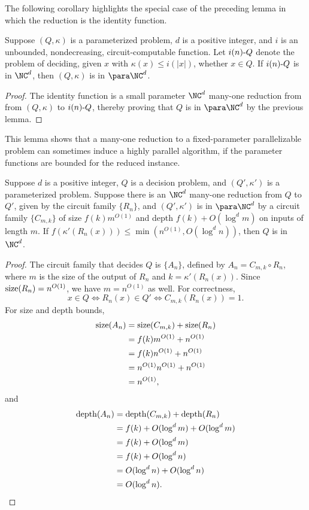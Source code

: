 The following corollary highlights the special case of the preceding lemma in which the reduction is the identity function.

\begin{corollary}\label{cor:sprself}
  Suppose $(Q, \kappa)$ is a parameterized problem, $d$ is a positive integer, and $i$ is an unbounded, nondecreasing, circuit-computable function.
  Let $i(n) \textnormal{-} Q$ denote the problem of deciding, given $x$ with $\kappa(x) \leq i(|x|)$, whether $x \in Q$.
  If $i(n) \textnormal{-} Q$ is in $\NC^d$, then $(Q, \kappa)$ is in $\para \NC^d$.
\end{corollary}
\begin{proof}
  The identity function is a small parameter $\NC^d$ many-one reduction from from $(Q, \kappa)$ to $i(n) \textnormal{-} Q$, thereby proving that $Q$ is in $\para \NC^d$ by the previous lemma.
\end{proof}

This lemma shows that a many-one reduction to a fixed-parameter parallelizable problem can sometimes induce a highly parallel algorithm, if the parameter functions are bounded for the reduced instance.

\begin{lemma}\label{lem:reducetonc}
  Suppose $d$ is a positive integer, $Q$ is a decision problem, and $(Q', \kappa')$ is a parameterized problem.
  Suppose there is an $\NC^d$ many-one reduction from $Q$ to $Q'$, given by the circuit family $\{R_n\}$, and $(Q', \kappa')$ is in $\para \NC^d$ by a circuit family $\{C_{m, k}\}$ of size $f(k) m^{O(1)}$ and depth $f(k) + O(\log^d m)$ on inputs of length $m$.
  If $f(\kappa'(R_n(x))) \leq \min(n^{O(1)}, O(\log^d n))$, then $Q$ is in $\NC^d$.
\end{lemma}
\begin{proof}
  The circuit family that decides $Q$ is $\{A_n\}$, defined by $A_n = C_{m, k} \circ R_n$, where $m$ is the size of the output of $R_n$ and $k = \kappa'(R_n(x))$.
  Since $\operatorname{size}(R_n) = n^{O(1)}$, we have $m = n^{O(1)}$ as well.
  For correctness,
  \[
  x \in Q \iff R_n(x) \in Q' \iff C_{m, k}(R_n(x)) = 1.
  \]
  For size and depth bounds,
  \begin{align*}
    \operatorname{size}(A_n) & = \operatorname{size}(C_{m, k}) + \operatorname{size}(R_n) \\
    & = f(k) m^{O(1)} + n^{O(1)} \\
    & = f(k) n^{O(1)} + n^{O(1)} \\
    & = n^{O(1)} n^{O(1)} + n^{O(1)} \\
    & = n^{O(1)},
  \end{align*}
  and
  \begin{align*}
    \operatorname{depth}(A_n) & = \operatorname{depth}(C_{m, k}) + \operatorname{depth}(R_n) \\
    & = f(k) + O(\log^d m) + O(\log^d m) \\
    & = f(k) + O(\log^d m) \\
    & = f(k) + O(\log^d n) \\
    & = O(\log^d n) + O(\log^d n) \\
    & = O(\log^d n). \qedhere
  \end{align*}
\end{proof}

